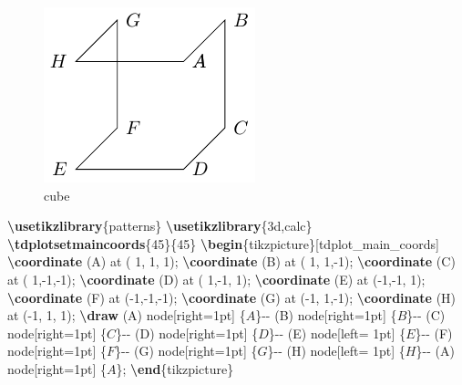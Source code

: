 \documentclass[
]{book}
\newenvironment{Shaded}{\begin{snugshade}}{\end{snugshade}}
\newcommand{\ExtensionTok}[1]{#1}
\newcommand{\FunctionTok}[1]{\textcolor[rgb]{0.13,0.29,0.53}{\textbf{#1}}}
\newcommand{\KeywordTok}[1]{\textcolor[rgb]{0.13,0.29,0.53}{\textbf{#1}}}
\newcommand{\NormalTok}[1]{#1}
\newcommand{\SpecialStringTok}[1]{\textcolor[rgb]{0.31,0.60,0.02}{#1}}
\theoremstyle{definition}
\theoremstyle{definition}
\theoremstyle{definition}
\theoremstyle{definition}
\theoremstyle{remark}
\begin{document}
\begin{figure}
\includegraphics[width=0.75\linewidth]{202401311000-TikZ_files/figure-latex/unnamed-chunk-61-1} \caption{cube}\label{fig:unnamed-chunk-61}
\end{figure}

\begin{Shaded}
\begin{Highlighting}[]
\FunctionTok{\textbackslash{}usetikzlibrary}\NormalTok{\{patterns\}}
\FunctionTok{\textbackslash{}usetikzlibrary}\NormalTok{\{3d,calc\}}
\FunctionTok{\textbackslash{}tdplotsetmaincoords}\NormalTok{\{45\}\{45\}}
\KeywordTok{\textbackslash{}begin}\NormalTok{\{}\ExtensionTok{tikzpicture}\NormalTok{\}[tdplot\_main\_coords]}
  \FunctionTok{\textbackslash{}coordinate}\NormalTok{ (A) at ( 1, 1, 1);}
  \FunctionTok{\textbackslash{}coordinate}\NormalTok{ (B) at ( 1, 1,{-}1);}
  \FunctionTok{\textbackslash{}coordinate}\NormalTok{ (C) at ( 1,{-}1,{-}1);}
  \FunctionTok{\textbackslash{}coordinate}\NormalTok{ (D) at ( 1,{-}1, 1);}
  \FunctionTok{\textbackslash{}coordinate}\NormalTok{ (E) at ({-}1,{-}1, 1);}
  \FunctionTok{\textbackslash{}coordinate}\NormalTok{ (F) at ({-}1,{-}1,{-}1);}
  \FunctionTok{\textbackslash{}coordinate}\NormalTok{ (G) at ({-}1, 1,{-}1);}
  \FunctionTok{\textbackslash{}coordinate}\NormalTok{ (H) at ({-}1, 1, 1);}
  \FunctionTok{\textbackslash{}draw}\NormalTok{ (A) node[right=1pt] \{}\SpecialStringTok{$A$}\NormalTok{\}{-}{-}}
\NormalTok{        (B) node[right=1pt] \{}\SpecialStringTok{$B$}\NormalTok{\}{-}{-}}
\NormalTok{        (C) node[right=1pt] \{}\SpecialStringTok{$C$}\NormalTok{\}{-}{-}}
\NormalTok{        (D) node[right=1pt] \{}\SpecialStringTok{$D$}\NormalTok{\}{-}{-}}
\NormalTok{        (E) node[left= 1pt] \{}\SpecialStringTok{$E$}\NormalTok{\}{-}{-}}
\NormalTok{        (F) node[right=1pt] \{}\SpecialStringTok{$F$}\NormalTok{\}{-}{-}}
\NormalTok{        (G) node[right=1pt] \{}\SpecialStringTok{$G$}\NormalTok{\}{-}{-}}
\NormalTok{        (H) node[left= 1pt] \{}\SpecialStringTok{$H$}\NormalTok{\}{-}{-}}
\NormalTok{        (A) node[right=1pt] \{}\SpecialStringTok{$A$}\NormalTok{\};}
\KeywordTok{\textbackslash{}end}\NormalTok{\{}\ExtensionTok{tikzpicture}\NormalTok{\}}
\end{Highlighting}
\end{Shaded}
\end{document}
